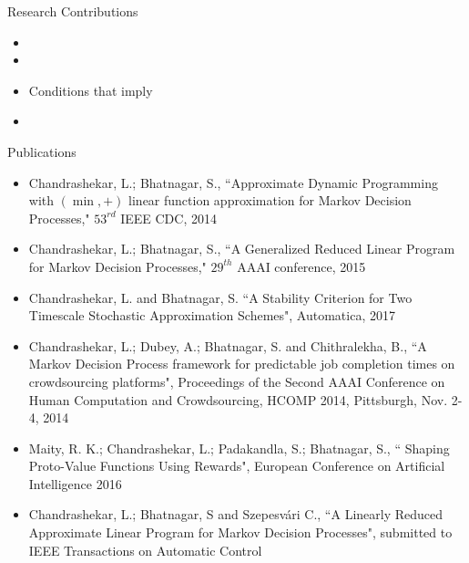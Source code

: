 \documentclass[10pt]{beamer}
\begin{document}
\begin{frame}[fragile]{Research Contributions}
\begin{itemize}
\item {\color{teal}{Convergent approximate algorithms in }} {\color{orange}{tropical linear}} {\color{teal}{basis}}
\item {\color{teal}{Geometric characterization of}} {\color{orange}{approximate linear programming}} {\color{teal}{for large scale Markov Decision Processes}}
\item {\color{teal} {Conditions that imply}} {\color{orange}{stability of multi-timescale stochastic }} {\color{teal}{approximation algorithms}}
\item {\color{teal}{Optimal Pricing of}} {\color{orange}{crowdsourced}} {\color{teal}{tasks}}
\end{itemize}
\end{frame}

\begin{frame}[fragile]{Publications}
\small
\begin{itemize}
\item Chandrashekar, L.; Bhatnagar, S., ``Approximate Dynamic Programming with $(\min,+)$ linear function approximation for Markov Decision Processes," $53^{rd}$ IEEE CDC, 2014\\
\item Chandrashekar, L.; Bhatnagar, S., ``A Generalized Reduced Linear Program for Markov Decision Processes," $29^{th}$ AAAI conference, 2015

\item Chandrashekar, L. and  Bhatnagar, S. ``A Stability Criterion for Two Timescale Stochastic Approximation Schemes",  Automatica, 2017

\item Chandrashekar, L.;  Dubey, A.; Bhatnagar, S. and Chithralekha, B., ``A Markov Decision Process framework for predictable job completion times on crowdsourcing platforms", Proceedings of the Second {AAAI} Conference on Human Computation and Crowdsourcing, {HCOMP} 2014, Pittsburgh, Nov. 2-4, 2014
\item Maity, R. K.; Chandrashekar, L.;  Padakandla, S.; Bhatnagar, S., `` Shaping Proto-Value Functions Using Rewards", European Conference on Artificial Intelligence 2016\\
\item Chandrashekar, L.;  Bhatnagar, S and Szepesv\'{a}ri C., ``A Linearly Reduced Approximate Linear Program for Markov Decision Processes", submitted to IEEE Transactions on Automatic Control
\end{itemize}
\end{frame}
\end{document}
